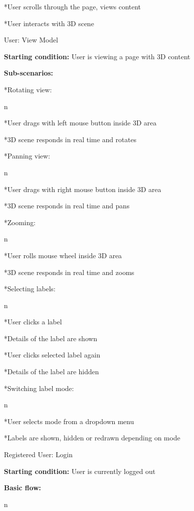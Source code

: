 *User scrolls through the page, views content

*User interacts with 3D scene

\enditems

\secc User: View Model

{\bf Starting condition:} User is viewing a page with 3D content

{\bf Sub-scenarios:}

\begitems

*Rotating view:

\begitems \style n

*User drags with left mouse button inside 3D area

*3D scene responds in real time and rotates

\enditems

*Panning view:

\begitems \style n

*User drags with right mouse button inside 3D area

*3D scene responds in real time and pans

\enditems

*Zooming:

\begitems \style n

*User rolls mouse wheel inside 3D area

*3D scene responds in real time and zooms

\enditems

*Selecting labels:

\begitems \style n

*User clicks a label

*Details of the label are shown

*User clicks selected label again

*Details of the label are hidden

\enditems

*Switching label mode:

\begitems \style n

*User selects mode from a dropdown menu

*Labels are shown, hidden or redrawn depending on mode

\enditems

\enditems

\secc Registered User: Login

{\bf Starting condition:} User is currently logged out

{\bf Basic flow:}

\begitems \style n

